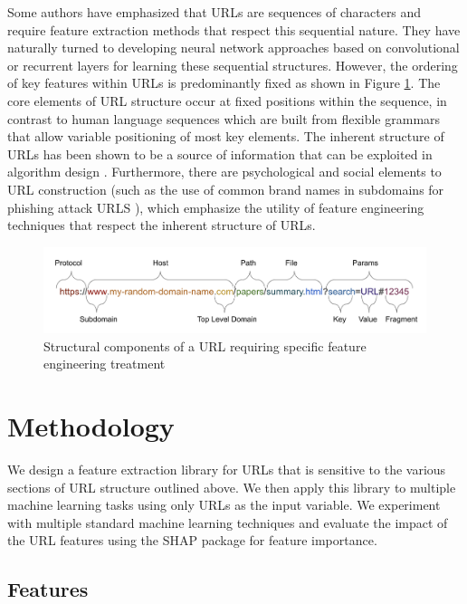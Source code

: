\documentclass[sigconf]{acmart}
\begin{document}
Some authors have 
emphasized that URLs are sequences of characters and require feature extraction methods that respect 
this sequential nature\cite{Le2018,Vazhayil2018}. They have naturally turned to developing neural network approaches
based on convolutional or recurrent layers for learning these sequential structures.
However, the ordering of key features within URLs is predominantly fixed as shown in Figure \ref{fig:url_structure}.
The core elements of URL structure occur at fixed positions within the sequence, in contrast to human language
sequences which are built from flexible grammars that allow variable positioning of most key elements. The
inherent structure of URLs has been shown to be a source of information that can be exploited in algorithm design \cite{Shih2004}.
Furthermore,
there are psychological and social elements to URL construction (such as the use of common brand names in subdomains
for phishing attack URLS \cite{Tupsamudre2019}), which emphasize the utility of feature engineering techniques that
respect the inherent structure of URLs.

\begin{figure}
\centering
\includegraphics[scale=0.6]{images/URL_parts.png}
\caption{Structural components of a URL requiring specific feature engineering treatment}
\label{fig:url_structure}
\end{figure}



\section{Methodology}

We design a feature extraction library for URLs that is sensitive to the various sections of URL
structure outlined above. We then apply this library to multiple machine learning tasks using only URLs
as the input variable. We experiment with multiple standard machine learning techniques and evaluate
the impact of the URL features using the SHAP package for feature importance.

\subsection{Features}
\end{document}
